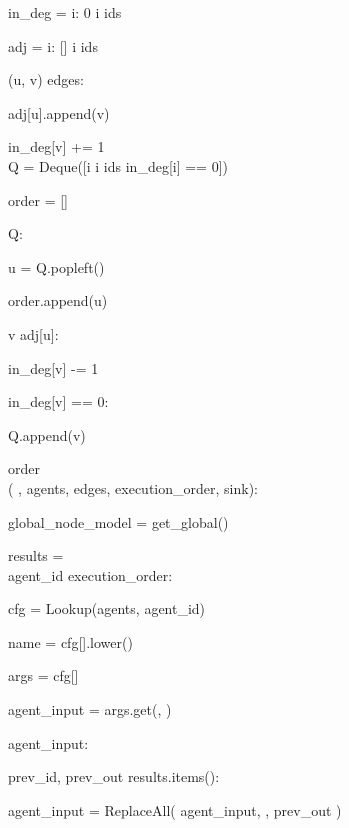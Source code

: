 \begin{subagent}[title=High DoM Parser]
\quad in\_deg = \code{\{}i: 0  i  ids\code{\}}

\quad adj = \code{\{}i: []  i  ids\code{\}}

\quad {} (u, v)  edges:

\quad\quad adj[u].append(v)

\quad\quad in\_deg[v] += 1 \\

\quad Q = Deque([i  i  ids  in\_deg[i] == 0])

\quad order = []

\quad {} Q:

\quad\quad u = Q.popleft()

\quad\quad order.append(u)

\quad\quad {} v  adj[u]:

\quad\quad\quad in\_deg[v] -= 1

\quad\quad\quad {} in\_deg[v] == 0:

\quad\quad\quad\quad Q.append(v)

\quad {} order \\



  (
, agents, edges, execution\_order, sink):

\quad global\_node\_model = get\_global()

\quad {}

\quad results = \code{\{\}} \\

\quad {} agent\_id  execution\_order:

\quad\quad cfg = Lookup(agents, agent\_id)

\quad\quad name = cfg[].lower()

\quad\quad args = cfg[]

\quad\quad agent\_input = args.get(, ) \\

\quad\quad {}

\quad\quad {} agent\_input:

\quad\quad\quad {} prev\_id, prev\_out  results.items():

\quad\quad\quad\quad agent\_input = ReplaceAll(
agent\_input,
,
prev\_out
) \\


\end{subagent}
